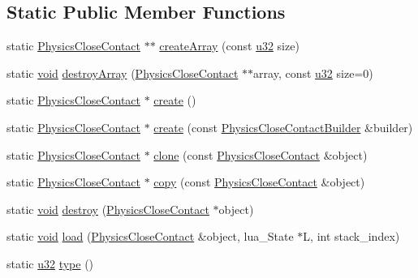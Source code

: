 \subsection*{Static Public Member Functions}
\begin{DoxyCompactItemize}
\item 
static \mbox{\hyperlink{classnjli_1_1_physics_close_contact}{Physics\+Close\+Contact}} $\ast$$\ast$ \mbox{\hyperlink{classnjli_1_1_physics_close_contact_a7111929b332ea06f9c9d0c37a5d6df55}{create\+Array}} (const \mbox{\hyperlink{_util_8h_a10e94b422ef0c20dcdec20d31a1f5049}{u32}} size)
\item 
static \mbox{\hyperlink{_thread_8h_af1e856da2e658414cb2456cb6f7ebc66}{void}} \mbox{\hyperlink{classnjli_1_1_physics_close_contact_ac5b6a7fe1b9d376dea7e051004e118b9}{destroy\+Array}} (\mbox{\hyperlink{classnjli_1_1_physics_close_contact}{Physics\+Close\+Contact}} $\ast$$\ast$array, const \mbox{\hyperlink{_util_8h_a10e94b422ef0c20dcdec20d31a1f5049}{u32}} size=0)
\item 
static \mbox{\hyperlink{classnjli_1_1_physics_close_contact}{Physics\+Close\+Contact}} $\ast$ \mbox{\hyperlink{classnjli_1_1_physics_close_contact_a798fa044971cb937c50ca688db22e7b5}{create}} ()
\item 
static \mbox{\hyperlink{classnjli_1_1_physics_close_contact}{Physics\+Close\+Contact}} $\ast$ \mbox{\hyperlink{classnjli_1_1_physics_close_contact_a6cdd2f44f6e1dc6a8051e95977c2f374}{create}} (const \mbox{\hyperlink{classnjli_1_1_physics_close_contact_builder}{Physics\+Close\+Contact\+Builder}} \&builder)
\item 
static \mbox{\hyperlink{classnjli_1_1_physics_close_contact}{Physics\+Close\+Contact}} $\ast$ \mbox{\hyperlink{classnjli_1_1_physics_close_contact_a2853031635fead8faa6ebeab24206613}{clone}} (const \mbox{\hyperlink{classnjli_1_1_physics_close_contact}{Physics\+Close\+Contact}} \&object)
\item 
static \mbox{\hyperlink{classnjli_1_1_physics_close_contact}{Physics\+Close\+Contact}} $\ast$ \mbox{\hyperlink{classnjli_1_1_physics_close_contact_a845f18318e0609f18bb675ad23e9cb2d}{copy}} (const \mbox{\hyperlink{classnjli_1_1_physics_close_contact}{Physics\+Close\+Contact}} \&object)
\item 
static \mbox{\hyperlink{_thread_8h_af1e856da2e658414cb2456cb6f7ebc66}{void}} \mbox{\hyperlink{classnjli_1_1_physics_close_contact_af392bda92b22ec489c8a91af4e02a7e6}{destroy}} (\mbox{\hyperlink{classnjli_1_1_physics_close_contact}{Physics\+Close\+Contact}} $\ast$object)
\item 
static \mbox{\hyperlink{_thread_8h_af1e856da2e658414cb2456cb6f7ebc66}{void}} \mbox{\hyperlink{classnjli_1_1_physics_close_contact_a96820db038f8e09a99b52418c5a38f86}{load}} (\mbox{\hyperlink{classnjli_1_1_physics_close_contact}{Physics\+Close\+Contact}} \&object, lua\+\_\+\+State $\ast$L, int stack\+\_\+index)
\item 
static \mbox{\hyperlink{_util_8h_a10e94b422ef0c20dcdec20d31a1f5049}{u32}} \mbox{\hyperlink{classnjli_1_1_physics_close_contact_a41098eadbced0e1b4ce390fccffdea4e}{type}} ()
\end{DoxyCompactItemize}

